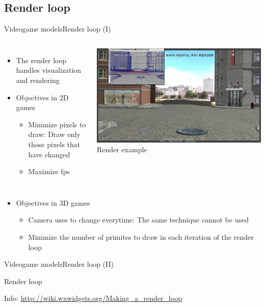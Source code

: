 \documentclass[10pt,compress]{beamer} %
\begin{document}
\subsection{Render loop}
\begin{frame}{Videogame models}{Render loop (I)}
    \begin{columns}
		\begin{itemize}
	   	\item The render loop handles visualization and rendering
	   	\item Objectives in 2D games
		\begin{itemize}
			\item Minimize pixels to draw: Draw only those pixels that have changed
			\item Maximize fps
		\end{itemize}
		\end{itemize}
	\centering\includegraphics[width=0.8\linewidth]{figs/rendering}\\
	Render example
 	\end{columns}
	\begin{itemize}
	\item Objectives in 3D games
		\begin{itemize}
			\item Camera uses to change everytime: The same technique cannot be used
			\item Minimize the number of primites to draw in each iteration of the render loop
		\end{itemize}
	\end{itemize}
\end{frame}

\begin{frame}{Videogame models}{Render loop (II)}
	    \vspace{-0.2cm}
    \begin{block}{Render loop}
	    \vspace{-0.2cm}
	    
		\vspace{-0.2cm}
	\end{block}
	Info: \url{http://wiki.wxwidgets.org/Making\_a\_render\_loop}
\end{frame}
\end{document}
